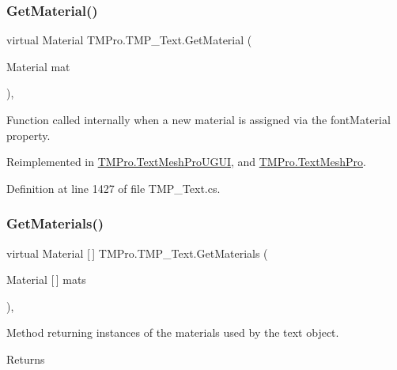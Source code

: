 \subsubsection{\texorpdfstring{GetMaterial()}{GetMaterial()}}
{\footnotesize\ttfamily virtual Material T\+M\+Pro.\+T\+M\+P\+\_\+\+Text.\+Get\+Material (\begin{DoxyParamCaption}\item[{Material}]{mat }\end{DoxyParamCaption})\hspace{0.3cm}{\ttfamily [protected]}, {\ttfamily [virtual]}}



Function called internally when a new material is assigned via the font\+Material property. 



Reimplemented in \mbox{\hyperlink{class_t_m_pro_1_1_text_mesh_pro_u_g_u_i_a51ff5f00ca136e0cb8c8865bb6e6ede9}{T\+M\+Pro.\+Text\+Mesh\+Pro\+U\+G\+UI}}, and \mbox{\hyperlink{class_t_m_pro_1_1_text_mesh_pro_ae6a678bcadc435d05afa59758e5b70f4}{T\+M\+Pro.\+Text\+Mesh\+Pro}}.



Definition at line 1427 of file T\+M\+P\+\_\+\+Text.\+cs.

\mbox{\label{class_t_m_pro_1_1_t_m_p___text_a1979f92c718db50761d2773c9c724e81}} 
\subsubsection{\texorpdfstring{GetMaterials()}{GetMaterials()}}
{\footnotesize\ttfamily virtual Material \mbox{[}$\,$\mbox{]} T\+M\+Pro.\+T\+M\+P\+\_\+\+Text.\+Get\+Materials (\begin{DoxyParamCaption}\item[{Material \mbox{[}$\,$\mbox{]}}]{mats }\end{DoxyParamCaption})\hspace{0.3cm}{\ttfamily [protected]}, {\ttfamily [virtual]}}



Method returning instances of the materials used by the text object. 

\begin{DoxyReturn}{Returns}

\end{DoxyReturn}


